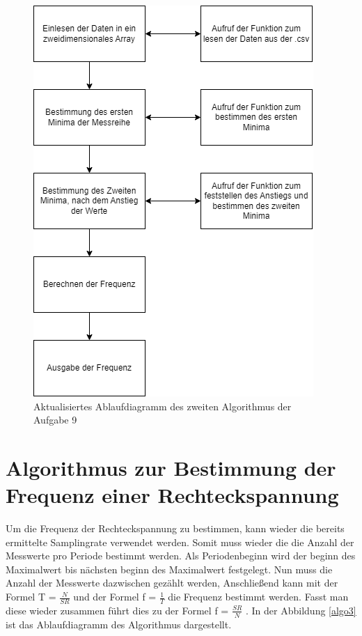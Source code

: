 \begin{figure}[h]
	\centering
	\includegraphics[scale=0.5]{Images/aufgabe9_algo2.1.png}
	\caption{Aktualisiertes Ablaufdiagramm des zweiten Algorithmus der Aufgabe 9}
	\label{algo2.1}
\end{figure}

\section{Algorithmus zur Bestimmung der Frequenz einer Rechteckspannung}
Um die Frequenz der Rechteckspannung zu bestimmen, kann wieder die bereits ermittelte Samplingrate verwendet werden. 
Somit muss wieder die die Anzahl der Messwerte pro Periode bestimmt werden.
Als Periodenbeginn wird der beginn des Maximalwert bis nächsten beginn des Maximalwert festgelegt.
Nun muss die Anzahl der Messwerte dazwischen gezählt werden,
Anschließend kann mit der Formel T = $\frac{N}{SR}$ und der Formel f = $\frac{1}{T}$ die Frequenz bestimmt werden.
Fasst man diese wieder zusammen führt dies zu der Formel f = $\frac{SR}{N}$ .
In der Abbildung \ref{algo3} ist das Ablaufdiagramm des Algorithmus dargestellt.\par

